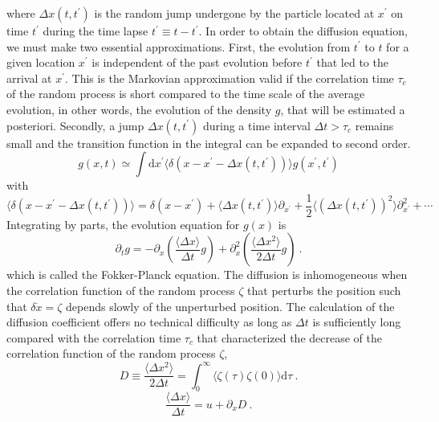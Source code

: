 \documentclass[12pt,a4paper]{article}
\newcommand{\dif}{\mathrm{d}}
\begin{document}
where $\Delta x(t, t^\prime)$ is the random jump undergone by the particle located at $x^\prime$ on time $t^\prime$ during the time lapse $t^\prime \equiv t-t^\prime$. In order to obtain the diffusion equation, we must make two essential approximations. First, the evolution from $t^\prime$ to $t$ for a given location $x^\prime$ is independent of the past evolution before $t^\prime$ that led to the arrival at $x^\prime$. This is the Markovian approximation valid if the correlation time $\tau_c$ of the random process is short compared to the time scale of the average evolution, in other words, the evolution of the density $g$, that will be estimated a posteriori. Secondly, a jump $\Delta x(t, t^\prime)$ during a time interval $\Delta t > \tau_c$ remains small and the transition function in the integral can be expanded to second order. 
\begin{equation}
g(x, t) \simeq \int \dif x^\prime \langle \delta (x-x^\prime -\Delta x(t, t^\prime)) \rangle g(x^\prime, t^\prime)
\end{equation}
with
\begin{equation}
\langle \delta (x-x^\prime -\Delta x(t, t^\prime)) \rangle = \delta(x-x^\prime) +\langle \Delta x(t, t^\prime) \rangle \partial_{x^\prime} +\frac{1}{2}\langle (\Delta x(t, t^\prime) )^2 \rangle \partial^2_{x^\prime} + \cdots
\end{equation}
Integrating by parts, the evolution equation for $g(x)$ is 
\begin{equation}
\partial_t g = -\partial_x \left(\frac{\langle \Delta x \rangle}{\Delta t} g\right) +\partial^2_x \left(\frac{\langle \Delta x^2 \rangle}{2\Delta t} g \right) ~.
\end{equation}
which is called the Fokker-Planck equation. The diffusion is inhomogeneous when the correlation function of the random process $\zeta$ that perturbs the position such that $\delta \dot{x} = \zeta$ depends slowly of the unperturbed position. The calculation of the diffusion coefficient offers no technical difficulty as long as $\Delta t$ is sufficiently long compared with the correlation time $\tau_c$ that characterized the decrease of the correlation function of the random process $\zeta$,
\begin{equation}
D \equiv \frac{\langle \Delta x^2 \rangle}{2\Delta t} = \int_0^\infty \langle \zeta(\tau) \zeta(0) \rangle \dif \tau ~.
\end{equation}
\begin{equation}
\frac{\langle \Delta x \rangle}{\Delta t} = u +\partial_x D ~.
\end{equation}
\end{document}
